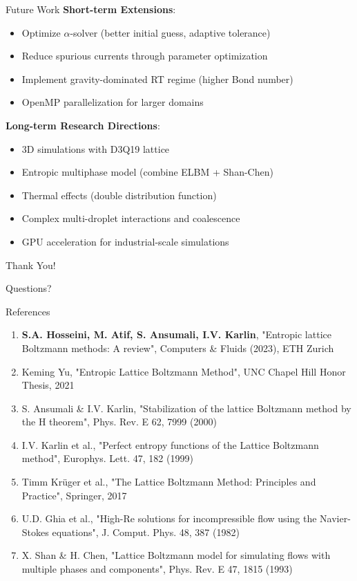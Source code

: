 \documentclass[aspectratio=169]{beamer}
\begin{document}
\begin{frame}{Future Work}
\textbf{Short-term Extensions}:
\begin{itemize}
    \item Optimize $\alpha$-solver (better initial guess, adaptive tolerance)
    \item Reduce spurious currents through parameter optimization
    \item Implement gravity-dominated RT regime (higher Bond number)
    \item OpenMP parallelization for larger domains
\end{itemize}

\vspace{0.5cm}
\textbf{Long-term Research Directions}:
\begin{itemize}
    \item 3D simulations with D3Q19 lattice
    \item Entropic multiphase model (combine ELBM + Shan-Chen)
    \item Thermal effects (double distribution function)
    \item Complex multi-droplet interactions and coalescence
    \item GPU acceleration for industrial-scale simulations
\end{itemize}
\end{frame}

\begin{frame}[standout]
\Huge Thank You!

\vspace{1.5cm}
\normalsize
Questions?
\end{frame}

\appendix

\begin{frame}{References}
\small
\begin{enumerate}
    \item \textbf{S.A. Hosseini, M. Atif, S. Ansumali, I.V. Karlin}, "Entropic lattice Boltzmann methods: A review", Computers \& Fluids (2023), ETH Zurich
    \item Keming Yu, "Entropic Lattice Boltzmann Method", UNC Chapel Hill Honor Thesis, 2021
    \item S. Ansumali \& I.V. Karlin, "Stabilization of the lattice Boltzmann method by the H theorem", Phys. Rev. E 62, 7999 (2000)
    \item I.V. Karlin et al., "Perfect entropy functions of the Lattice Boltzmann method", Europhys. Lett. 47, 182 (1999)
    \item Timm Krüger et al., "The Lattice Boltzmann Method: Principles and Practice", Springer, 2017
    \item U.D. Ghia et al., "High-Re solutions for incompressible flow using the Navier-Stokes equations", J. Comput. Phys. 48, 387 (1982)
    \item X. Shan \& H. Chen, "Lattice Boltzmann model for simulating flows with multiple phases and components", Phys. Rev. E 47, 1815 (1993)
\end{enumerate}
\end{frame}
\end{document}
